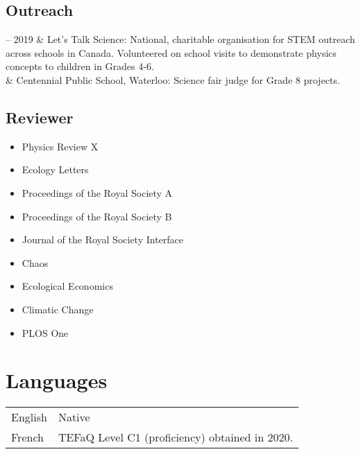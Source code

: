 \documentclass[11pt, a4paper]{article}
\newcommand{\TablePad}{\vspace{-0.4cm}}
\newcommand{\Duration}[2]{\fontsize{10pt}{0}\selectfont #1 -- #2}
\newcommand{\Year}[1]{\fontsize{10pt}{0}\selectfont #1}
\begin{document}
\subsection{Outreach}
\begin{EntriesTable}
  \Duration{2016}{2019} & 
  Let’s Talk Science: National, charitable organisation for STEM outreach across schools in Canada. 
  Volunteered on school visits to demonstrate physics concepts to children in Grades 4-6.
  \\
  \Year{2017} & 
  Centennial Public School, Waterloo: Science fair judge for Grade 8 projects.
\end{EntriesTable}




\subsection{Reviewer}

\begin{itemize}
  \item Physics Review X
  \item Ecology Letters
  \item Proceedings of the Royal Society A
  \item Proceedings of the Royal Society B
  \item Journal of the Royal Society Interface
  \item Chaos 
  \item Ecological Economics
  \item Climatic Change
  \item PLOS One

\end{itemize}






\section{Languages}

\TablePad
\begin{tabularx}{\textwidth}{@{}p{} p{}@{}}
  English & Native
  \\
  French & TEFaQ Level C1 (proficiency) obtained in 2020.
\end{tabularx}
\end{document}
